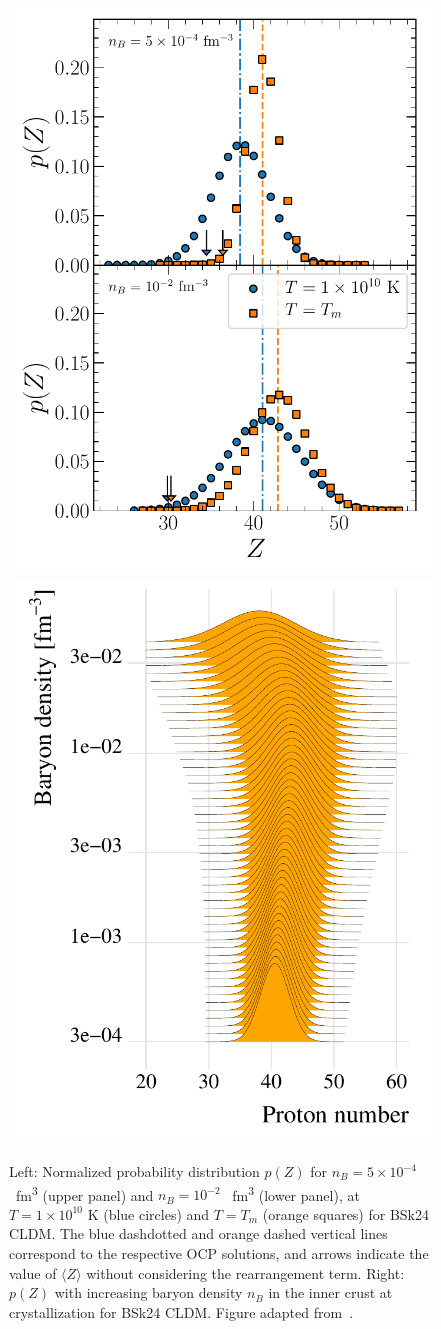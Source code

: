 \begin{figure}[!t]
  \begin{center}
    \includegraphics[width=0.49\linewidth]{figures/pj_icrust_bsk24.pdf}
    \includegraphics[width=0.49\linewidth]{figures/joyplot_bsk24_tm.pdf}
  \end{center}
  \caption[Normalized probability distribution of the atomic number $Z$ in the 
  inner-crust regime]{Left: Normalized 
    probability distribution 
    $p(Z)$ for $n_B=5\times 10^{-4}$ \si{\per \cubic\femto\meter} (upper
    panel) and $n_B=10^{-2}$ \si{\per \cubic\femto\meter} (lower panel), at 
    $T=1\times 10^{10}$ \si{\kelvin} (blue circles) and 
    $T=T_m$ (orange squares) for BSk24 CLDM. The blue dashdotted and orange 
    dashed vertical lines correspond to the respective OCP solutions, and 
    arrows indicate the value of $\langle Z\rangle$ without considering the 
    rearrangement term. Right: $p(Z)$ with increasing baryon density $n_B$ in 
    the inner crust at crystallization for BSk24 CLDM. Figure adapted 
  from~\cite{Carreau2020}.}\label{fig:pj_icrust}
\end{figure}
